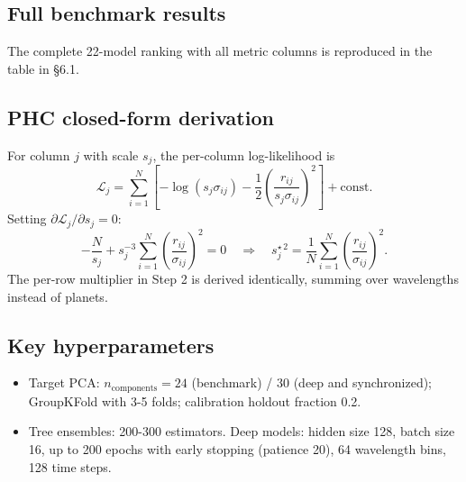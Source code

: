 \documentclass[12pt]{article}
\begin{document}
\subsection{Full benchmark results}

The complete 22-model ranking with all metric columns is reproduced in the table in \S{}6.1.

\subsection{PHC closed-form derivation}

For column $j$ with scale $s_j$, the per-column log-likelihood is
\[
\mathcal{L}_j = \sum_{i=1}^N \left[-\log(s_j\sigma_{ij}) - \frac{1}{2}\left(\frac{r_{ij}}{s_j\sigma_{ij}}\right)^2\right] + \text{const}.
\]
Setting $\partial\mathcal{L}_j/\partial s_j = 0$:
\[
-\frac{N}{s_j} + s_j^{-3}\sum_{i=1}^N\left(\frac{r_{ij}}{\sigma_{ij}}\right)^2 = 0 \quad\Longrightarrow\quad s_j^{\star\,2} = \frac{1}{N}\sum_{i=1}^N \left(\frac{r_{ij}}{\sigma_{ij}}\right)^2.
\]
The per-row multiplier in Step 2 is derived identically, summing over wavelengths instead of planets.

\subsection{Key hyperparameters}

\begin{itemize}
\item Target PCA: $n_{\text{components}} = 24$ (benchmark) / 30 (deep and synchronized); GroupKFold with 3-5 folds; calibration holdout fraction 0.2.
\item Tree ensembles: 200-300 estimators. Deep models: hidden size 128, batch size 16, up to 200 epochs with early stopping (patience 20), 64 wavelength bins, 128 time steps.
\end{itemize}
\end{document}
